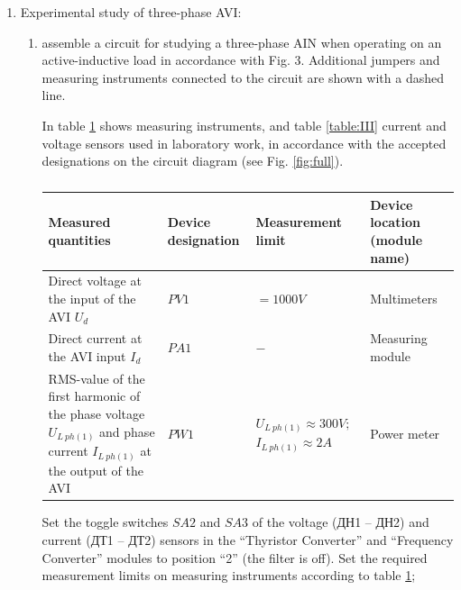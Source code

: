 \documentclass[a4paper,14pt]{article}
\begin{document}
\begin{enumerate}
\begin{enumerate}
\end{enumerate}


\item Experimental study of three-phase AVI:

\begin{enumerate}
\item assemble a circuit for studying a three-phase AIN when operating on an active-inductive load in accordance with Fig. 3. Additional jumpers and measuring instruments connected to the circuit are shown with a dashed line.

In table \ref{table:II} shows measuring instruments, and table \ref{table:III} current and voltage sensors used in laboratory work, in accordance with the accepted designations on the circuit diagram (see Fig. \ref{fig:full}).


\begin{table}[!ht]
\begin{tabular}{p{}p{}p{}p{}}
\toprule
Measured quantities& Device designation& Measurement limit & Device location (module name)\\
\midrule
Direct voltage at the input of the AVI $U_d$& $PV1$ & $=1000V$ &Multimeters\\
\midrule
Direct current at the AVI input $I_d$       & $PA1$ & $-$     & Measuring module\\
\midrule
RMS-value of the first harmonic of the phase voltage $U_{L\:ph(1)}$ and phase current $I_{L\:ph(1)}$ at the output of the AVI& $PW1$ &  $U_{L\:ph(1)}\approx 300V;$ $I_{L\:ph(1)}\approx 2A$ & 
Power meter
\end{tabular}
\caption{}
\label{table:II}
\end{table}
Set the toggle switches $SA2$ and $SA3$ of the voltage (ДН1 -- ДН2) and current (ДТ1 -- ДТ2) sensors in the “Thyristor Converter” and “Frequency Converter” modules to position “2” (the filter is off). Set the required measurement limits on measuring instruments according to table \ref{table:II};


\end{enumerate}
\end{enumerate}
\end{document}
